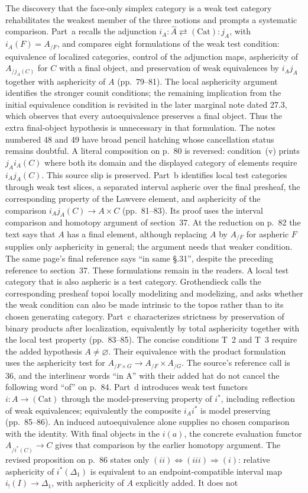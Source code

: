 \documentclass[10pt,oneside]{book}
\begin{document}
The discovery that the face-only simplex category is a weak test category rehabilitates the weakest member of the three notions and prompts a systematic comparison. Part~a recalls the adjunction $i_A:\widehat A\rightleftarrows(\mathrm{Cat}):j_A$, with $i_A(F)=A_{/F}$, and compares eight formulations of the weak test condition: equivalence of localized categories, control of the adjunction maps, asphericity of $A_{/j_A(C)}$ for $C$ with a final object, and preservation of weak equivalences by $i_Aj_A$ together with asphericity of $A$ (pp.~79--81). The local asphericity argument identifies the stronger counit conditions; the remaining implication from the initial equivalence condition is revisited in the later marginal note dated 27.3, which observes that every autoequivalence preserves a final object. Thus the extra final-object hypothesis is unnecessary in that formulation. The notes numbered 48 and 49 have broad pencil hatching whose cancellation status remains doubtful. A literal composition on p.~80 is reversed: condition~(v) prints $j_Ai_A(C)$ where both its domain and the displayed category of elements require $i_Aj_A(C)$. This source slip is preserved. Part~b identifies local test categories through weak test slices, a separated interval aspheric over the final presheaf, the corresponding property of the Lawvere element, and asphericity of the comparison $i_Aj_A(C)\to A\times C$ (pp.~81--83). Its proof uses the interval comparison and homotopy argument of section~37. At the reduction on p.~82 the text says that $A$ has a final element, although replacing $A$ by $A_{/F}$ for aspheric $F$ supplies only asphericity in general; the argument needs that weaker condition. The same page's final reference says ``in same \S.31'', despite the preceding reference to section~37. These formulations remain in the readers. A local test category that is also aspheric is a test category. Grothendieck calls the corresponding presheaf topoi locally modelizing and modelizing, and asks whether the weak condition can also be made intrinsic to the topos rather than to its chosen generating category. Part~c characterizes strictness by preservation of binary products after localization, equivalently by total asphericity together with the local test property (pp.~83--85). The concise conditions T~2 and T~3 require the added hypothesis $A\ne\varnothing$. Their equivalence with the product formulation uses the asphericity test for $A_{/F\times G}\to A_{/F}\times A_{/G}$. The source's reference call is 36, and the interlinear words ``in A'' with their added hat do not cancel the following word ``of'' on p.~84. Part~d introduces weak test functors $i:A\to(\mathrm{Cat})$ through the model-preserving property of $i^*$, including reflection of weak equivalences; equivalently the composite $i_Ai^*$ is model preserving (pp.~85--86). An induced autoequivalence alone supplies no chosen comparison with the identity. With final objects in the $i(a)$, the concrete evaluation functor $A_{/i^*(C)}\to C$ gives that comparison by the earlier homotopy argument. The revised proposition on p.~86 states only $(ii)\Leftrightarrow(iii)\Rightarrow(i)$: relative asphericity of $i^*(\Delta_1)$ is equivalent to an endpoint-compatible interval map $i_!(I)\to\Delta_1$, with asphericity of $A$ explicitly added. It does not 
\end{document}

